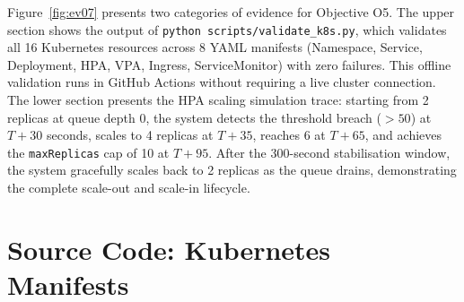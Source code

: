 \documentclass[12pt,a4paper]{report}
\begin{document}
Figure~\ref{fig:ev07} presents two categories of evidence for Objective O5. The upper
section shows the output of \texttt{python scripts/validate\_k8s.py}, which validates all
16 Kubernetes resources across 8 YAML manifests (Namespace, Service, Deployment, HPA,
VPA, Ingress, ServiceMonitor) with zero failures. This offline validation runs in GitHub
Actions without requiring a live cluster connection. The lower section presents the HPA
scaling simulation trace: starting from 2 replicas at queue depth 0, the system detects
the threshold breach ($>50$) at $T{+}30$ seconds, scales to 4 replicas at $T{+}35$,
reaches 6 at $T{+}65$, and achieves the \texttt{maxReplicas} cap of 10 at $T{+}95$.
After the 300-second stabilisation window, the system gracefully scales back to 2 replicas
as the queue drains, demonstrating the complete scale-out and scale-in lifecycle.

\section{Source Code: Kubernetes Manifests}
\end{document}
